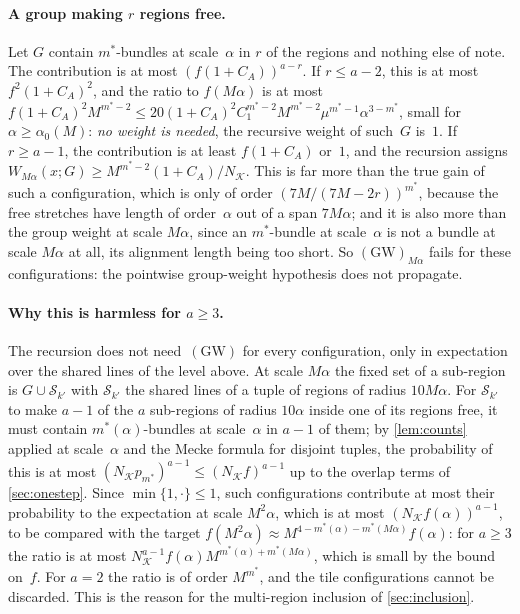 \documentclass[11pt,letterpaper]{article}
\newcommand{\cS}{\mathcal S}
\begin{document}
\paragraph{A group making $r$ regions free.} Let $G$ contain $m^*$-bundles at scale~$\alpha$ in $r$ of the regions and nothing else of note. The contribution is at most $(f(1+C_A))^{a-r}$. If $r\le a-2$, this is at most $f^2(1+C_A)^2$, and the ratio to $f(M\alpha)$ is at most $f(1+C_A)^2M^{m^*-2}\le20(1+C_A)^2C_1^{m^*-2}M^{m^*-2}\mu^{m^*-1}\alpha^{3-m^*}$, small for $\alpha\ge\alpha_0(M)$: \emph{no weight is needed}, the recursive weight of such~$G$ is~$1$. If $r\ge a-1$, the contribution is at least $f(1+C_A)$ or~$1$, and the recursion assigns $W_{M\alpha}(x;G)\ge M^{m^*-2}(1+C_A)/N_{\mathcal K}$. This is far more than the true gain of such a configuration, which is only of order $(7M/(7M-2r))^{m^*}$, because the free stretches have length of order~$\alpha$ out of a span $7M\alpha$; and it is also more than the group weight at scale $M\alpha$, since an $m^*$-bundle at scale~$\alpha$ is not a bundle at scale $M\alpha$ at all, its alignment length being too short. So $\mathrm{(GW)}_{M\alpha}$ fails for these configurations: the pointwise group-weight hypothesis does not propagate.

\paragraph{Why this is harmless for $a\ge3$.} The recursion does not need~$\mathrm{(GW)}$ for every configuration, only in expectation over the shared lines of the level above. At scale $M\alpha$ the fixed set of a sub-region is $G\cup\cS_{k'}$ with $\cS_{k'}$ the shared lines of a tuple of regions of radius $10M\alpha$. For $\cS_{k'}$ to make $a-1$ of the $a$ sub-regions of radius $10\alpha$ inside one of its regions free, it must contain $m^*(\alpha)$-bundles at scale~$\alpha$ in $a-1$ of them; by \cref{lem:counts} applied at scale~$\alpha$ and the Mecke formula for disjoint tuples, the probability of this is at most $(N_{\mathcal K}p_{m^*})^{a-1}\le(N_{\mathcal K}f)^{a-1}$ up to the overlap terms of \cref{sec:onestep}. Since $\min\{1,\cdot\}\le1$, such configurations contribute at most their probability to the expectation at scale $M^2\alpha$, which is at most $(N_{\mathcal K}f(\alpha))^{a-1}$, to be compared with the target $f(M^2\alpha)\approx M^{4-m^*(\alpha)-m^*(M\alpha)}f(\alpha)$: for $a\ge3$ the ratio is at most $N_{\mathcal K}^{a-1}f(\alpha)M^{m^*(\alpha)+m^*(M\alpha)}$, which is small by the bound on~$f$. For $a=2$ the ratio is of order $M^{m^*}$, and the tile configurations cannot be discarded. This is the reason for the multi-region inclusion of \cref{sec:inclusion}.
\end{document}

